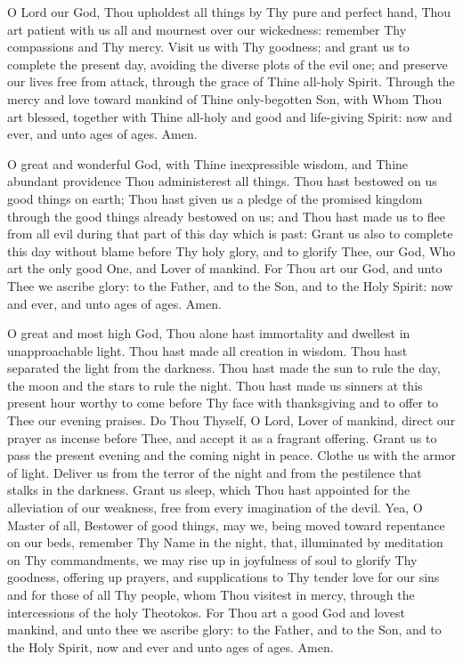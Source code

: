 \documentclass[twoside, letterpaper, 12pt]{report}
\begin{document}
\begin{priest}
  \item \small{ O Lord our God,
    Thou upholdest all things by Thy pure and perfect hand,
    Thou art patient with us all and mournest over our wickedness:
    remember Thy compassions and Thy mercy.
    Visit us with Thy goodness; and grant us to complete the present day,
    avoiding the diverse plots of the evil one; and preserve our lives free from attack,
    through the grace of Thine all-holy Spirit.
    Through the mercy and love toward mankind of Thine only-begotten Son,
    with Whom Thou art blessed, together with Thine all-holy and good and life-giving Spirit:
    now and ever, and unto ages of ages. Amen.}
  \item \small{ O great and wonderful God,
    with Thine inexpressible wisdom, and Thine abundant providence Thou administerest all things.
    Thou hast bestowed on us good things on earth;
    Thou hast given us a pledge of the promised kingdom through the good things
    already bestowed on us;
    and Thou hast made us to flee from all evil during that part of this day which is past:
    Grant us also to complete this day without blame before Thy holy glory, and to glorify Thee,
    our God, Who art the only good One, and Lover of mankind.
    For Thou art our God, and unto Thee we ascribe glory:
    to the Father, and to the Son, and to the Holy Spirit:
    now and ever, and unto ages of ages. Amen.}
  \item \small{ O great and most high God,
    Thou alone hast immortality and dwellest in unapproachable light.
    Thou hast made all creation in wisdom. Thou hast separated the light from
    the darkness. Thou hast made the sun to rule the day, the moon and the stars to rule the night.
    Thou hast made us sinners at this present hour worthy to come before Thy face with thanksgiving
    and to offer to Thee our evening praises. Do Thou Thyself, O Lord, Lover of mankind,
    direct our prayer as incense before Thee, and accept it as a fragrant offering.
    Grant us to pass the present evening and the coming night in peace.
    Clothe us with the armor of light.
    Deliver us from the terror of the night and from the pestilence that stalks in the darkness.
    Grant us sleep, which Thou hast appointed for the alleviation of our weakness,
    free from every imagination of the devil. Yea, O Master of all,
    Bestower of good things, may we, being moved toward repentance on our beds, remember Thy
    Name in the night, that, illuminated by meditation on Thy commandments, we may rise up in
    joyfulness of soul to glorify Thy goodness, offering up prayers,
    and supplications to Thy tender love for our sins and for those of all Thy people,
    whom Thou visitest in mercy, through the intercessions of the holy Theotokos.
    For Thou art a good God and lovest mankind, and unto thee
    we ascribe glory: to the Father, and to the Son, and to the Holy Spirit,
    now and ever and unto ages of ages. Amen.}
\end{priest}
\end{document}
